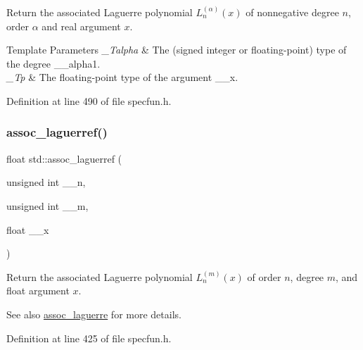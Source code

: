 Return the associated Laguerre polynomial $ L_n^{(\alpha)}(x) $ of nonnegative degree $ n $, order $ \alpha $ and real argument $ x $.


\begin{DoxyTemplParams}{Template Parameters}
{\em \+\_\+\+Talpha} & The (signed integer or floating-\/point) type of the degree {\ttfamily \+\_\+\+\_\+alpha1}. \\
\hline
{\em \+\_\+\+Tp} & The floating-\/point type of the argument {\ttfamily \+\_\+\+\_\+x}. \\
\hline
\end{DoxyTemplParams}


Definition at line 490 of file specfun.\+h.

\mbox{\label{group__cxx17__math__spec__func_gaf83d98f350a1cfcebee6a1f723cf90d2}} 
\subsubsection{\texorpdfstring{assoc\+\_\+laguerref()}{assoc\_laguerref()}}
{\footnotesize\ttfamily float std\+::assoc\+\_\+laguerref (\begin{DoxyParamCaption}\item[{unsigned int}]{\+\_\+\+\_\+n,  }\item[{unsigned int}]{\+\_\+\+\_\+m,  }\item[{float}]{\+\_\+\+\_\+x }\end{DoxyParamCaption})\hspace{0.3cm}{\ttfamily [inline]}}

Return the associated Laguerre polynomial $ L_n^{(m)}(x) $ of order $ n $, degree $ m $, and {\ttfamily float} argument $ x $.

\begin{DoxySeeAlso}{See also}
\hyperlink{group__cxx17__math__spec__func_ga0b33e0ac3066f2353861ce2f34b43f57}{assoc\+\_\+laguerre} for more details. 
\end{DoxySeeAlso}


Definition at line 425 of file specfun.\+h.

\mbox{\label{group__cxx17__math__spec__func_gac8e245671fb2df5de5fd978d03081f6c}} 

